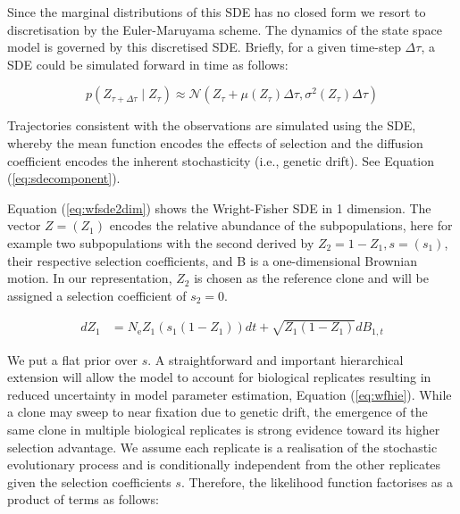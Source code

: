 \documentclass{article}
\newcommand{\eps}{N_\text{e}}
\begin{document}
Since the marginal distributions of this SDE has no closed form we resort to discretisation by the Euler-Maruyama \cite{malham2010introduction} scheme.
The dynamics of the state space model is governed by this discretised SDE. 
Briefly, for a given time-step $\Delta \tau$, a SDE could be simulated forward in time as follows:

\begin{equation} \label{eq:eulerssm}
p(Z_{\tau + \Delta \tau} \mid Z_{\tau}) \approx \mathcal{N} (Z_{\tau} + \mu(Z_\tau) \Delta \tau, \sigma^2 (Z_{\tau}) \Delta \tau)
\end{equation}

Trajectories consistent with the observations are simulated using the SDE, whereby the mean function encodes the effects of selection and the diffusion coefficient encodes the inherent stochasticity (i.e., genetic drift).
See Equation (\ref{eq:sdecomponent}).

Equation (\ref{eq:wfsde2dim}) shows the Wright-Fisher SDE in 1 dimension. 
The vector $Z = (Z_1)$ encodes the relative abundance of the subpopulations, here for example two subpopulations with the second derived by $Z_2 = 1 - Z_1, s = (s_1)$, their respective selection coefficients, and B is a one-dimensional Brownian motion.
In our representation, $Z_2$ is chosen as the reference clone and will be assigned a selection coefficient of $s_2 = 0$.

\begin{align}
\label{eq:wfsde2dim}
    dZ_1&=\eps Z_1(s_1(1-Z_1))dt + \sqrt{Z_1(1-Z_1)}dB_{1,t}
\end{align}    


We put a flat prior over $s$. 
A straightforward and important hierarchical extension will allow the model to account for biological replicates resulting in reduced uncertainty in model parameter estimation, Equation (\ref{eq:wfhie}).
While a clone may sweep to near fixation due to genetic drift, the emergence of the same clone in multiple biological replicates is strong evidence toward its higher selection advantage. 
We assume each replicate is a realisation of the stochastic evolutionary process and is conditionally independent from the other replicates given the selection coefficients $s$.
Therefore, the likelihood function factorises as a product of terms as follows:
\end{document}
